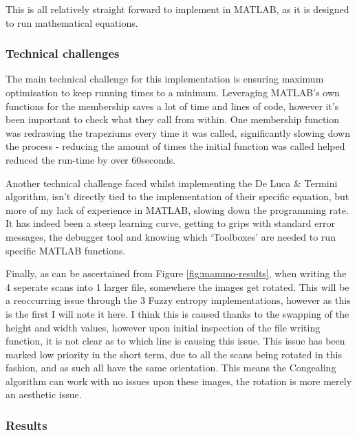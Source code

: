 This is all relatively straight forward to implement in MATLAB, as it is designed to run mathematical equations.


\subsubsection{Technical challenges}

The main technical challenge for this implementation is ensuring maximum optimisation to keep running times to a minimum. Leveraging MATLAB's own functions for the membership saves a lot of time and lines of code, however it's been important to check what they call from within. One membership function was redrawing the trapeziums every time it was called, significantly slowing down the process - reducing the amount of times the initial function was called helped reduced the run-time by over 60seconds.

Another technical challenge faced whilst implementing the De Luca \& Termini algorithm, isn't directly tied to the implementation of their specific equation, but more of my lack of experience in MATLAB, slowing down the programming rate. It has indeed been a steep learning curve, getting to grips with standard error messages, the debugger tool and knowing which `Toolboxes' are needed to run specific MATLAB functions.

Finally, as can be ascertained from Figure \ref{fig:mammo-results}, when writing the 4 seperate scans into 1 larger file, somewhere the images get rotated. This will be a reoccurring issue through the 3 Fuzzy entropy implementations, however as this is the first I will note it here. I think this is caused thanks to the swapping of the height and width values, however upon initial inspection of the file writing function, it is not clear as to which line is causing this issue. This issue has been marked low priority in the short term, due to all the scans being rotated in this fashion, and as such all have the same orientation. This means the \Gls{Congealing} algorithm can work with no issues upon these images, the rotation is more merely an aesthetic issue.

\subsubsection{Results}

